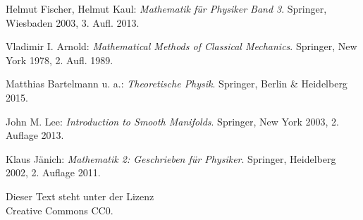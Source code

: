 \documentclass[a4paper,10pt,fleqn,twocolumn,twoside,dvipdfmx]{scrartcl}
\numberwithin{equation}{section}
\begin{document}
\newpage
\begin{thebibliography}{00}
 Helmut Fischer, Helmut Kaul:
\emph{Mathematik für Physiker Band 3}. Springer, Wiesbaden 2003, 3. Aufl. 2013.

 Vladimir I. Arnold: \emph{Mathematical Methods of Classical
Mechanics}. Springer, New York 1978, 2. Aufl. 1989.

 Matthias Bartelmann u. a.:
\emph{Theoretische Physik}. Springer, Berlin \& Heidelberg 2015.

 John M. Lee: \emph{Introduction to Smooth Manifolds}.
Springer, New York 2003, 2. Auflage 2013.

 Klaus Jänich: \emph{Mathematik 2: Geschrieben für
Physiker}. Springer, Heidelberg 2002, 2. Auflage 2011.
\end{thebibliography}

\vfill\noindent
Dieser Text steht unter der Lizenz\\
Creative Commons CC0.
\end{document}
